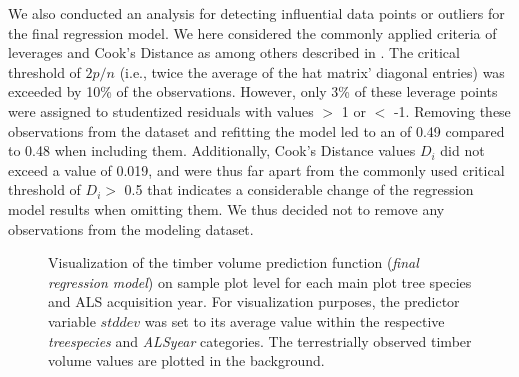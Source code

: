 We also conducted an analysis for detecting influential data points or outliers for the final regression model. We here considered the commonly applied criteria of leverages and Cook's Distance as among others described in \citet[pp. 160-167]{fahrmeir2013}. The critical threshold of $2p/n$ (i.e., twice the average of the hat matrix' diagonal entries) was exceeded by 10\% of the observations. However, only 3\% of these leverage points were assigned to studentized residuals with values $>$ 1 or $<$ -1. Removing these observations from the dataset and refitting the model led to an \adjrsq{} of 0.49 compared to 0.48 when including them. Additionally, Cook's Distance values $D_i$ did not exceed a value of 0.019, and were thus far apart from the commonly used critical threshold of $D_i >$ 0.5 that indicates a considerable change of the regression model results when omitting them. We thus decided not to remove any observations from the modeling dataset.

\begin{figure}[h]
	\centering
	\caption{Visualization of the timber volume prediction function (\textit{final regression model}) on sample plot level for each main plot tree species and ALS acquisition year. For visualization purposes, the predictor variable $stddev$ was set to its average value within the respective \textit{treespecies} and \textit{ALSyear} categories. The terrestrially observed timber volume values are plotted in the background.}
	\label{fig:predlines_tspec}
\end{figure}



